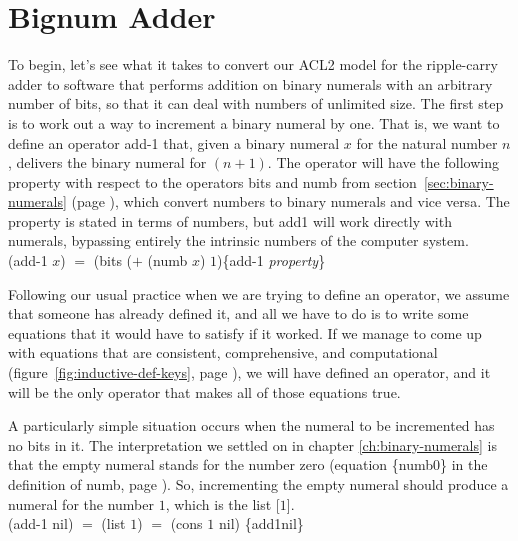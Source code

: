 \section{Bignum Adder}
\label{sec:bignum-adder}

To begin, let's see what it takes to convert our ACL2 model for
the ripple-carry adder to software that performs addition on
binary numerals with an arbitrary number of bits,
so that it can deal with numbers of unlimited size.
The first step is to work out a way to increment a
binary numeral by one.
That is,
we want to define an operator \textsf{add-1} that, given a
binary numeral $x$ for the natural number $n$, delivers the
binary numeral for $(n+1)$.
The operator will have the following
property with respect to the operators \textsf{bits} and \textsf{numb} from
section~\ref{sec:binary-numerals} (page \pageref{bits-defun}),
which convert numbers to binary numerals and vice versa.
The property is stated in terms of numbers,
but \textsf{add1} will work directly with numerals,
bypassing entirely the intrinsic numbers of the computer system.
\\
\vspace{2mm}
\hspace*{2cm}
\textsf{(add-1 $x$)} $=$ \textsf{(bits ($+$ (numb $x$) $1$)}\hfill\{add-1 \emph{property}\}

Following our usual practice when we are trying to define an operator,
we assume that someone has already defined it,
and all we have to do is to write some equations that it
would have to satisfy if it worked. If we manage
to come up with equations that are consistent, comprehensive, and computational
(figure~\ref{fig:inductive-def-keys}, page \pageref{fig:inductive-def-keys}),
we will have defined an operator,
and it will be the only operator that makes all of those equations true.

A particularly simple situation occurs when the numeral to be incremented
has no bits in it. The interpretation we settled on
in chapter \ref{ch:binary-numerals} is that
the empty numeral stands for the number zero
(equation \{numb0\} in the definition of \textsf{numb}, page \pageref{nmb-defun}).
So, incrementing the empty numeral should produce a numeral for the number $1$,
which is the list \textsf{[$1$]}.
\\
\vspace{2mm}
\hspace*{2cm}
\textsf{(add-1 nil)} $=$ \textsf{(list $1$)} $=$ \textsf{(cons $1$ nil)}  \hfill \{add1nil\}


